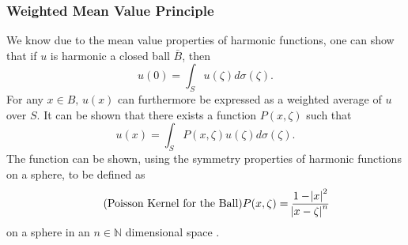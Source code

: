  \subsubsection{Weighted Mean Value Principle}
  We know due to the mean value properties of harmonic functions, one can show that if $u$ is harmonic a
  closed ball $\bar{B}$, then
   \begin{equation}
     u(0) = \int_{S}u(\zeta)d\sigma(\zeta).
     \label{eq:centerval}
    \end{equation}
  For any $x \in B\text{, }u(x)$ can furthermore be expressed as a weighted average of
  $u$ over $S$. It can be shown that there exists a function $P(x,\zeta)$ such that
  \begin{equation}u(x)=\int_{S}P(x,\zeta)u(\zeta)d\sigma(\zeta).\label{eq:weighted_average_integral} \end{equation}
     The function can be shown,
  using the symmetry properties of harmonic functions on a sphere, to be defined as
  \begin{equation}
    \tag{Poisson Kernel for the Ball}
    P(x,\zeta) = \frac{1 - \abs{x}^{2}}{\abs{x- \zeta}^{n}}
    \label{eq:poissonkernel}
  \end{equation}
  on a sphere in an $n \in \mathbb{N}$ dimensional space \cite{Axler1992}.
